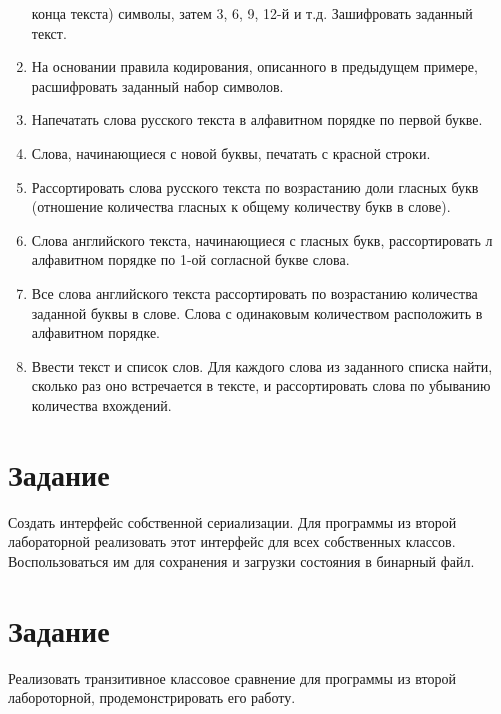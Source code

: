 \documentclass[12pt]{article}
\begin{document}
\begin{enumerate}
конца текста) символы, затем 3, 6, 9, 12-й и т.д. Зашифровать заданный текст.
	\item На основании правила кодирования, описанного в предыдущем примере, 
расшифровать заданный набор символов.
	\item Напечатать слова русского текста в алфавитном порядке по первой букве. 
	\item Слова, начинающиеся с новой буквы, печатать с красной строки.
	\item Рассортировать слова русского текста по возрастанию доли гласных букв 
(отношение количества гласных к общему количеству букв в слове).
	\item Слова английского текста, начинающиеся с гласных букв, рассортировать 
л алфавитном порядке по 1-ой согласной букве слова.
	\item Все слова английского текста рассортировать по возрастанию количества 
заданной буквы в слове. Слова с одинаковым количеством расположить в алфавитном 
порядке.
	\item Ввести текст и список слов. Для каждого слова из заданного списка 
найти, сколько раз оно встречается в тексте, и рассортировать слова по убыванию 
количества вхождений.
\end{enumerate}

\section{Задание}

Создать интерфейс собственной сериализации. Для программы из второй 
лабораторной реализовать этот интерфейс для всех собственных классов. 
Воспользоваться им для сохранения и загрузки состояния в бинарный файл.

\section{Задание}

Реализовать транзитивное классовое сравнение для программы из второй 
лабороторной, продемонстрировать его работу.
\end{document}
